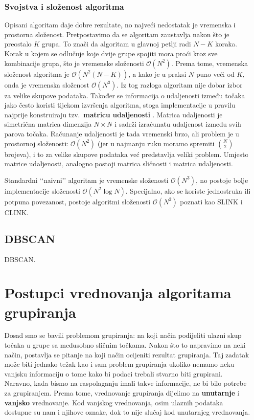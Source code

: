\documentclass[times, utf8, zavrsni]{fer}
\begin{document}
\subsection{Svojstva i složenost algoritma}
Opisani algoritam daje dobre rezultate, no najveći nedostatak je vremenska i prostorna složenost. Pretpostavimo da se algoritam zaustavlja nakon što je preostalo $K$ grupa. To znači da algoritam u glavnoj petlji radi $N-K$ koraka. Korak u kojem se odlučuje koje dvije grupe spojiti mora proći kroz sve kombinacije grupa, što je vremenske složenosti $\mathcal{O} \left(N^2\right)$. Prema tome, vremenska složenost algoritma je $\mathcal{O} \left(N^2 \left(N-K\right)\right)$, a kako je u praksi $N$ puno veći od $K$, onda je vremenska složenost $\mathcal{O} \left(N^3\right)$. Iz tog razloga algoritam nije dobar izbor za velike skupove podataka. Također se informacija o udaljenosti između točaka jako često koristi tijekom izvršenja algoritma, stoga implementacije u pravilu najprije konstruiraju tzv.\ \textbf{matricu udaljenosti} . Matrica udaljenosti je simetrična matrica dimenzija $N \times N$ i sadrži izračunatu udaljenost između svih parova točaka. Računanje udaljenosti je tada vremenski brzo, ali problem je u prostornoj složenosti: $\mathcal{O} \left(N^2\right)$ (jer u najmanju ruku moramo spremiti $\binom{N}{2}$ brojeva), i to za velike skupove podataka već predstavlja veliki problem. Umjesto matrice udaljenosti, analogno postoji matrica sličnosti i matrica udaljenosti.

Standardni ‘‘naivni’’ algoritam je vremenske složenosti $\mathcal{O} \left(N^3\right)$, no postoje bolje implementacije složenosti $\mathcal{O} \left(N^2 \log N\right)$. Specijalno, ako se koriste jednostruka ili potpuna povezanost, postoje algoritmi složenosti $\mathcal{O} \left(N^2\right)$ poznati kao SLINK i CLINK.

\section{DBSCAN}
DBSCAN.

\chapter{Postupci vrednovanja algoritama grupiranja}
Dosad smo se bavili problemom grupiranja: na koji način podijeliti ulazni skup točaka u grupe sa međusobno sličnim točkama. Nakon što to napravimo na neki način, postavlja se pitanje na koji način ocijeniti rezultat grupiranja. Taj zadatak može biti jednako težak kao i sam problem grupiranja ukoliko nemamo neku vanjsku informaciju o tome kako bi podaci trebali stvarno biti grupirani. Naravno, kada bismo na raspolaganju imali takve informacije, ne bi bilo potrebe za grupiranjem. Prema tome, vrednovanje grupiranja dijelimo na \textbf{unutarnje}  i \textbf{vanjsko}  vrednovanje. Kod vanjskog vrednovanja, osim ulaznih podataka dostupne su nam i njihove oznake, dok to nije slučaj kod unutarnjeg vrednovanja.
\end{document}
